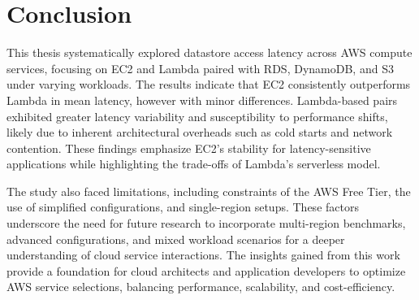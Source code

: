 \section{Conclusion}
\label{cha:conclusion}

This thesis systematically explored datastore access latency across AWS compute services, focusing on EC2 and Lambda paired with RDS, DynamoDB, and S3 under varying workloads. The results indicate that EC2 consistently outperforms Lambda in mean latency, however with minor differences. Lambda-based pairs exhibited greater latency variability and susceptibility to performance shifts, likely due to inherent architectural overheads such as cold starts and network contention. These findings emphasize EC2's stability for latency-sensitive applications while highlighting the trade-offs of Lambda's serverless model.

The study also faced limitations, including constraints of the AWS Free Tier, the use of simplified configurations, and single-region setups. These factors underscore the need for future research to incorporate multi-region benchmarks, advanced configurations, and mixed workload scenarios for a deeper understanding of cloud service interactions. The insights gained from this work provide a foundation for cloud architects and application developers to optimize AWS service selections, balancing performance, scalability, and cost-efficiency.

